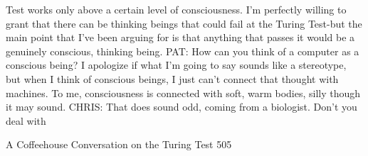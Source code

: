    Test works only above a certain level of consciousness. I'm perfectly willing to
   grant that there can be thinking beings that could fail at the Turing Test-but the
   main point that I've been arguing for is that anything that passes it would be a
   genuinely conscious, thinking being.
PAT: How can you think of a computer as a conscious being? I apologize if what I'm
   going to say sounds like a stereotype, but when I think of conscious beings, I just
   can't connect that thought with machines. To me, consciousness is connected
   with soft, warm bodies, silly though it may sound.
CHRIS: That does sound odd, coming from a biologist. Don't you deal with




A Coffeehouse Conversation on the Turing Test                                          505


